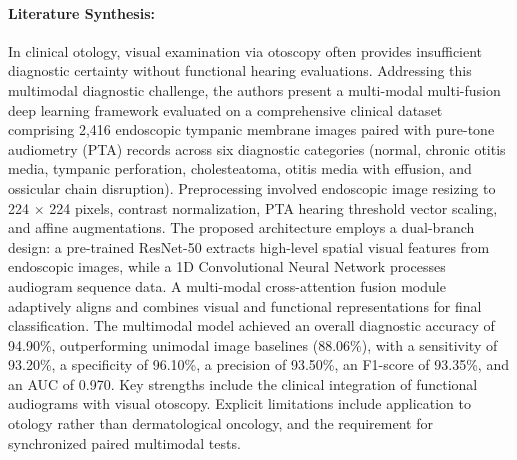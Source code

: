 \paragraph{Literature Synthesis:} In clinical otology, visual examination via otoscopy often provides insufficient diagnostic certainty without functional hearing evaluations. Addressing this multimodal diagnostic challenge, the authors present a multi-modal multi-fusion deep learning framework evaluated on a comprehensive clinical dataset comprising 2,416 endoscopic tympanic membrane images paired with pure-tone audiometry (PTA) records across six diagnostic categories (normal, chronic otitis media, tympanic perforation, cholesteatoma, otitis media with effusion, and ossicular chain disruption). Preprocessing involved endoscopic image resizing to 224 $\times$ 224 pixels, contrast normalization, PTA hearing threshold vector scaling, and affine augmentations. The proposed architecture employs a dual-branch design: a pre-trained ResNet-50 extracts high-level spatial visual features from endoscopic images, while a 1D Convolutional Neural Network processes audiogram sequence data. A multi-modal cross-attention fusion module adaptively aligns and combines visual and functional representations for final classification. The multimodal model achieved an overall diagnostic accuracy of 94.90\%, outperforming unimodal image baselines (88.06\%), with a sensitivity of 93.20\%, a specificity of 96.10\%, a precision of 93.50\%, an F1-score of 93.35\%, and an AUC of 0.970. Key strengths include the clinical integration of functional audiograms with visual otoscopy. Explicit limitations include application to otology rather than dermatological oncology, and the requirement for synchronized paired multimodal tests.

